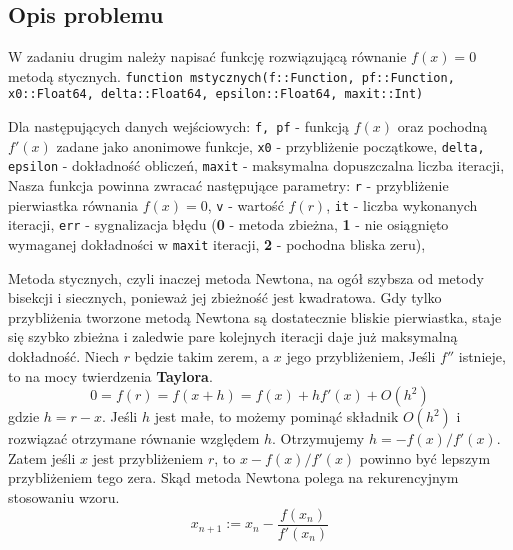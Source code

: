 \documentclass{article}
\begin{document}
\begin{center}
    \subsection{Opis problemu}
    \large W zadaniu drugim należy napisać funkcję rozwiązującą równanie \(f(x) = 0\) metodą stycznych. \newline
    \texttt{function mstycznych(f::Function, pf::Function, x0::Float64, delta::Float64, epsilon::Float64, maxit::Int)} \newline
    \begin{flushleft}
       Dla następujących danych wejściowych: \newline
       \texttt{f, pf} - funkcją \(f(x)\) oraz pochodną \(f'(x)\) zadane jako anonimowe funkcje, \newline
       \texttt{x0} - przybliżenie początkowe, \newline
       \texttt{delta, epsilon} - dokładność obliczeń, \newline
       \texttt{maxit} - maksymalna dopuszczalna liczba iteracji, \newline
       \newline
       Nasza funkcja powinna zwracać następujące parametry: \newline
       \texttt{r} - przybliżenie pierwiastka równania \(f(x) = 0\), \newline
       \texttt{v} - wartość \(f(r)\), \newline
       \texttt{it} - liczba wykonanych iteracji, \newline
       \texttt{err} - sygnalizacja błędu (\textbf{0} - metoda zbieżna, \textbf{1} - nie osiągnięto wymaganej dokładności w \texttt{maxit} iteracji, \textbf{2} - pochodna bliska zeru), \newline
    \end{flushleft}
    Metoda stycznych, czyli inaczej metoda Newtona, na ogół szybsza od metody bisekcji i siecznych, ponieważ jej zbieżność jest kwadratowa.
    Gdy tylko przybliżenia tworzone metodą Newtona są dostatecznie bliskie pierwiastka, staje się szybko zbieżna i zaledwie pare kolejnych iteracji daje już maksymalną dokładność.
    Niech \(r\) będzie takim zerem, a \(x\) jego przybliżeniem, Jeśli \(f''\) istnieje, to na mocy twierdzenia \textbf{Taylora}.
    \[0 = f(r) = f(x + h) = f(x) + hf'(x) + O(h^2)\] \newline
    gdzie \(h = r - x\). Jeśli \(h\) jest małe, to możemy pominąć składnik \(O(h^2)\) i rozwiązać otrzymane równanie względem \(h\).
    Otrzymujemy \(h = -f(x)/f'(x)\). Zatem jeśli \(x\) jest przybliżeniem \(r\), to \(x - f(x)/f'(x)\) powinno być lepszym przybliżeniem tego zera.
    Skąd metoda Newtona polega na rekurencyjnym stosowaniu wzoru. 
    \[x_{n+1} := x_{n} - \frac{f(x_{n})}{f'(x_{n})}\] 

\end{center}
\end{document}
